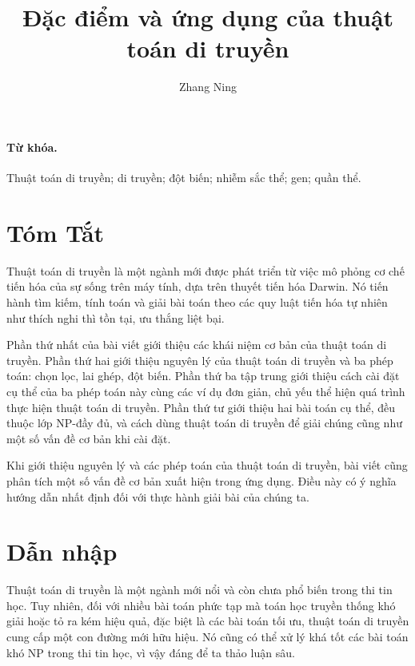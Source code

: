 \documentclass[11pt]{article}
\title{Đặc điểm và ứng dụng của thuật toán di truyền}
\author{Zhang Ning}
\date{}
\begin{document}
\maketitle


\paragraph{Từ khóa.}
Thuật toán di truyền; di truyền; đột biến; nhiễm sắc thể; gen; quần thể.

\section*{Tóm Tắt}

Thuật toán di truyền là một ngành mới được phát triển từ việc mô phỏng cơ chế
tiến hóa của sự sống trên máy tính, dựa trên thuyết tiến hóa Darwin. Nó tiến
hành tìm kiếm, tính toán và giải bài toán theo các quy luật tiến hóa tự nhiên
như thích nghi thì tồn tại, ưu thắng liệt bại.

Phần thứ nhất của bài viết giới thiệu các khái niệm cơ bản của thuật toán di
truyền. Phần thứ hai giới thiệu nguyên lý của thuật toán di truyền và ba phép
toán: chọn lọc, lai ghép, đột biến. Phần thứ ba tập trung giới thiệu cách cài
đặt cụ thể của ba phép toán này cùng các ví dụ đơn giản, chủ yếu thể hiện quá
trình thực hiện thuật toán di truyền. Phần thứ tư giới thiệu hai bài toán cụ
thể, đều thuộc lớp NP-đầy đủ, và cách dùng thuật toán di truyền để giải chúng
cũng như một số vấn đề cơ bản khi cài đặt.

Khi giới thiệu nguyên lý và các phép toán của thuật toán di truyền, bài viết
cũng phân tích một số vấn đề cơ bản xuất hiện trong ứng dụng. Điều này có ý
nghĩa hướng dẫn nhất định đối với thực hành giải bài của chúng ta.

\tableofcontents

\section{Dẫn nhập}

Thuật toán di truyền là một ngành mới nổi và còn chưa phổ biến trong thi tin
học. Tuy nhiên, đối với nhiều bài toán phức tạp mà toán học truyền thống khó
giải hoặc tỏ ra kém hiệu quả, đặc biệt là các bài toán tối ưu, thuật toán di
truyền cung cấp một con đường mới hữu hiệu. Nó cũng có thể xử lý khá tốt các
bài toán khó NP trong thi tin học, vì vậy đáng để ta thảo luận sâu.
\end{document}
